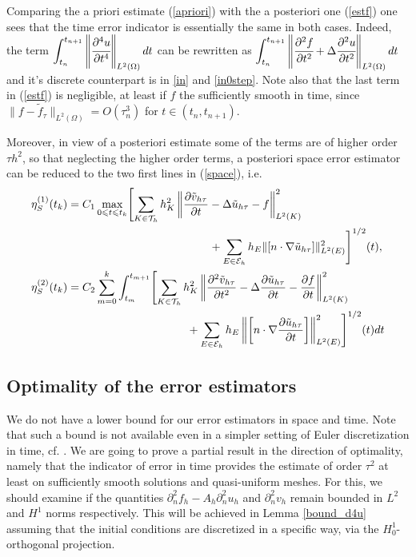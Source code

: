 \documentclass{imanum}
\begin{document}
\begin{remark}
 Comparing the a priori estimate (\ref{apriori}) with the a posteriori one (\ref{estf}) one sees that the time error indicator is essentially the same in both cases. Indeed, the term $\displaystyle\int_{t_n}^{t_{n + 1}} \left\Vert \cfrac{\partial^4 u }{\partial t^4} \right\Vert_{L^2(\Omega)} {dt}$ can be rewritten as $\displaystyle\int_{t_n}^{t_{n + 1}} \left\Vert \cfrac{\partial^2 f }{\partial t^2} + \Delta \cfrac{\partial^2 u }{\partial t^2} \right\Vert_{L^2(\Omega)} {dt}$ and it's discrete counterpart is in \ref{in} and \ref{in0step}. 
 Note also that the last term in (\ref{estf}) is negligible, at least if $f$ the sufficiently smooth in time, since $\|f-\tilde{f}_\tau\|_{L^2(\Omega)}=O(\tau_n^3)$ for $t\in(t_n,t_{n+1})$.
 
Moreover, in view of a posteriori estimate some of the terms are of higher order $\tau h^2$, so that neglecting the higher order terms, a posteriori space error estimator can be reduced to the two first lines in (\ref{space}), i.e.
 \begin{align}
 \label{space1}  \eta_S^{(1)} (t_k) &= C_1 \max_{0 \leqslant t \leqslant t_k} \Biggl[ \sum_{K \in \mathcal{T}_h}
   h_K^2  \left\Vert \frac{\partial \tilde{v}_{h \tau}}{\partial t} - \Delta \tilde{u}_{h \tau}-f
   \right\Vert_{L^2(K)}^2\\
   \notag&~~~~~~~~~~~~~~~~~~~~~~~~~~~~~~~~~~~~~~+ \sum_{
E \in \mathcal{E}_h}h_{E} \|[n \cdot \nabla \tilde{u}_{h
   \tau}]\|_{L^2(E)}^2 \Biggr]^{1/2} (t),\\
\label{space2}
 \eta_S^{(2)} (t_k)&= C_2\sum_{m = 0}^k \int_{t_m}^{t_{m + 1}} \Biggl[ \sum_{K \in \mathcal{T}_h} h_K^2
  \left\Vert \frac{\partial^2 \tilde{v}_{h \tau}}{\partial t^2} - \Delta \frac{\partial
  \tilde{u}_{h\tau}}{\partial t} -\frac{\partial{f}}{\partial{t}}\right\Vert_{L^2(K)}^2\\
  \notag&~~~~~~~~~~~~~~~~~~~~~~~~~~~~~~~~+ \sum_{
E \in \mathcal{E}_h}h_{E} \left\Vert\left[n \cdot
  \nabla \frac{\partial \tilde{u}_{h\tau}}{\partial t}\right]\right\Vert_{L^2(E)}^2
  \Biggr]^{1/2} (t) dt
 \end{align}
\end{remark}


\subsection{Optimality of the error estimators}\label{optimality}
We do not have a lower bound for our error estimators in space and time. Note that such a bound is not available even in a simpler setting of Euler discretization in time, cf. \cite{BS}. We are going to prove a partial result in the direction of optimality, namely that the indicator of error in time provides the estimate of order $\tau^2$ at least on sufficiently smooth solutions and quasi-uniform meshes. For this, we should examine if the quantities $\partial_n^2 f_h - A_h \partial_n^2 u_h$ and $\partial^2_n v_h$ remain bounded in $L^2$ and $H^1$ norms respectively.  This will be achieved in Lemma \ref{bound_d4u} assuming that the initial conditions are discretized in a specific way, via the $H^1_0$-orthogonal projection.
\end{document}
